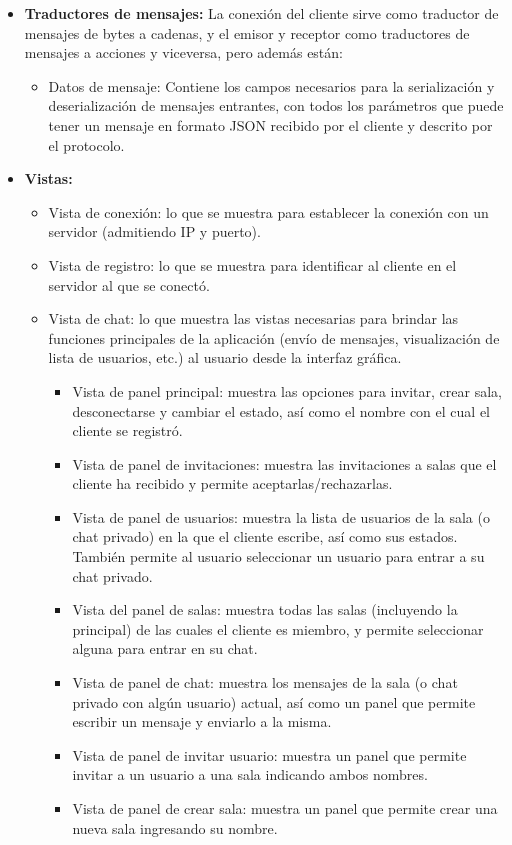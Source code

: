 \begin{itemize}
\begin{itemize}
	\end{itemize}
	\item \textbf{Traductores de mensajes:} La conexión del cliente  sirve como traductor de mensajes de bytes a cadenas, y el emisor y receptor como traductores de mensajes a acciones y viceversa, pero además están:
	\begin{itemize}
		\item Datos de mensaje: Contiene los campos necesarios para la serialización y deserialización de mensajes entrantes, con todos los parámetros que puede tener un mensaje en formato JSON recibido por el cliente y descrito por el protocolo.
	
	\end{itemize}
	\item \textbf{Vistas:}
	\begin{itemize}
		\item Vista de conexión: lo que se muestra para establecer la conexión con un servidor (admitiendo IP y puerto).
		\item Vista de registro: lo que se muestra para identificar al cliente en el servidor al que se conectó.
		\item Vista de chat: lo que muestra las vistas necesarias para brindar las funciones principales de la aplicación (envío de mensajes, visualización de lista de usuarios, etc.) al usuario desde la interfaz gráfica.
		\begin{itemize}
			\item Vista de panel principal: muestra las opciones para invitar, crear sala, desconectarse y cambiar el estado, así como el nombre con el cual el cliente se registró.
			\item Vista de panel de invitaciones: muestra las invitaciones a salas que el cliente ha recibido y permite aceptarlas/rechazarlas.
			\item Vista de panel de usuarios: muestra la lista de usuarios de la sala (o chat privado) en la que el cliente escribe, así como sus estados. También permite al usuario seleccionar un usuario para entrar a su chat privado.
			\item Vista del panel de salas: muestra todas las salas (incluyendo la principal) de las cuales el cliente es miembro, y permite seleccionar alguna para entrar en su chat.
			\item Vista de panel de chat: muestra los mensajes de la sala (o chat privado con algún usuario) actual, así como un panel que permite escribir un mensaje y enviarlo a la misma.
			\item Vista de panel de invitar usuario: muestra un panel que permite invitar a un usuario a una sala indicando ambos nombres.
			\item Vista de panel de crear sala: muestra un panel que permite crear una nueva sala ingresando su nombre.
		\end{itemize}
	

\end{itemize}
\end{itemize}
